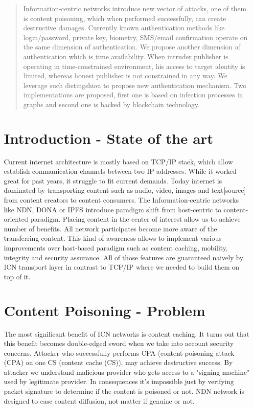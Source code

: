 \documentclass[nostrict]{szablonPG}
\begin{document}
\tableofcontents
\listoffigures


\begin{abstract}
Information-centric networks introduce new vector of attacks, one of them is content poisoning, which when performed successfully, can create destructive damages. Currently known authentication methods like login/password, private key, biometry, SMS/email confirmation operate on the same dimension of authentication. We propose another dimension of authentication which is time availability. When intruder publisher is operating in time-constrained environment, his access to target identity is limited, whereas honest publisher is not constrained in any way. We leverage such distingshion to propose new authentication mechanism. Two implementations are proposed, first one is based on infection processes in graphs and second one is backed by blockchain technology. 


\end{abstract}



\section{Introduction - State of the art}
Current internet architecture is mostly based on TCP/IP stack, which allow  establish communication channels between two IP addresses. While it worked great for past years,  it struggle to fit current demands. Today internet is dominated by transporting content such as audio, video, images and text[source] from content creators to content consumers.
The Information-centric networks like NDN\cite{zhang2014named}, DONA\cite{koponen2007data} or IPFS \cite{benet2014ipfs} introduce paradigm shift from host-centric to content-oriented paradigm. Placing content in the center of interest allow us to achieve number of benefits. All network participates become more aware of the transferring content. This kind of awareness allows to implement various improvements over host-based paradigm such as content caching, mobility, integrity and security assurance. All of those features are guaranteed naively by ICN transport layer in contrast to TCP/IP where we needed to build them on top of it.

\section{Content Poisoning - Problem}
The most significant benefit of ICN networks is content caching. It turns out that this benefit becomes double-edged sword when we take into account security concerns. Attacker who successfully performs CPA (content-poisoning attack (CPA) on one CS (content cache (CS)), may achieve destructive success.
By attacker we understand malicious provider who gets access to a "signing machine" used by legitimate provider. In consequences it's impossible just by verifying packet signature to determine if the content is poisoned or not. NDN network is designed to ease content diffusion, not matter if genuine or not.
\end{document}
